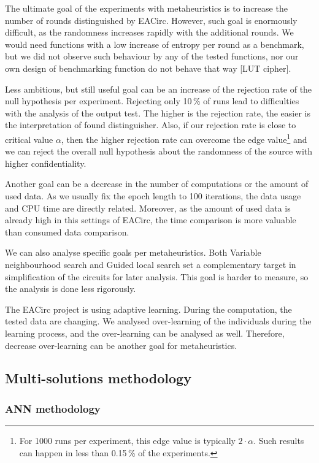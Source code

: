 \documentclass[
  print, %
  Table,   %
  nolof,     %
  nolot,     %
  11pt, %
  oneside  %
]{fithesis3}
\begin{document}
The ultimate goal of the experiments with metaheuristics is to increase the number of rounds distinguished by EACirc. However, such goal is enormously difficult, as the randomness increases rapidly with the additional rounds. We would need functions with a low increase of entropy per round as a benchmark, but we did not observe such behaviour by any of the tested functions, nor our own design of benchmarking function do not behave that way [LUT cipher].

Less ambitious, but still useful goal can be an increase of the rejection rate of the null hypothesis per experiment. Rejecting only 10\,\% of runs lead to difficulties with the analysis of the output test. The higher is the rejection rate, the easier is the interpretation of found distinguisher. Also, if our rejection rate is close to critical value $\alpha$, then the higher rejection rate can overcome the edge value\footnote{For 1000 runs per experiment, this edge value is typically $2\cdot\alpha$. Such results can happen in less than 0.15\,\% of the experiments.} and we can reject the overall null hypothesis about the randomness of the source with higher confidentiality.

Another goal can be a decrease in the number of computations or the amount of used data. As we usually fix the epoch length to 100 iterations, the data usage and CPU time are directly related. Moreover, as the amount of used data is already high in this settings of EACirc, the time comparison is more valuable than consumed data comparison.

We can also analyse specific goals per metaheuristics. Both Variable neighbourhood search and Guided local search set a complementary target in simplification of the circuits for later analysis. This goal is harder to measure, so the analysis is done less rigorously.

The EACirc project is using adaptive learning. During the computation, the tested data are changing. We analysed over-learning of the individuals during the learning process, and the over-learning can be analysed as well. Therefore, decrease over-learning can be another goal for metaheuristics.

\subsection{Multi-solutions methodology}
\label{subsec:method-spec-ms}
\subsubsection{ANN methodology}
\label{subsubsec:method-spec-ms-aco}
\end{document}
